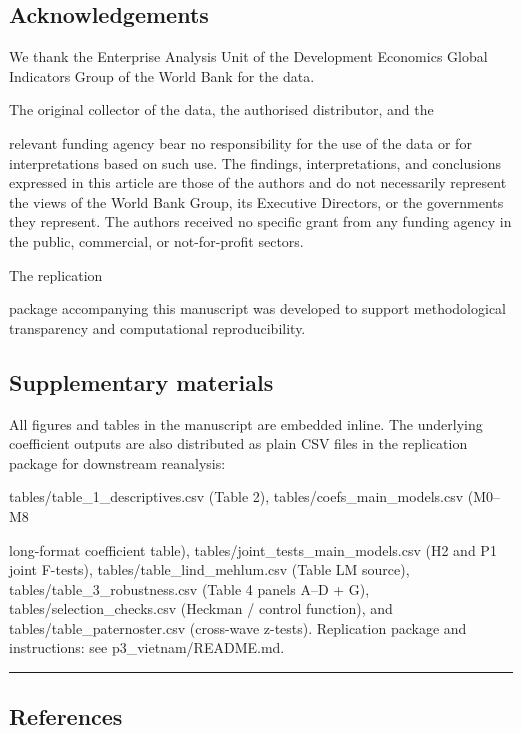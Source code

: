 \documentclass[12pt,a4paper]{article}
\begin{document}
\hypertarget{acknowledgements}{%
\subsection{Acknowledgements}\label{acknowledgements}}

We thank the Enterprise Analysis Unit of the Development Economics
Global Indicators Group of the World Bank for the data.

The original collector of the data, the authorised distributor, and the

relevant funding agency bear no responsibility for the use of the data
or for interpretations based on such use. The findings, interpretations,
and conclusions expressed in this article are those of the authors and
do not necessarily represent the views of the World Bank Group, its
Executive Directors, or the governments they represent. The authors
received no specific grant from any funding agency in the public,
commercial, or not-for-profit sectors.

The replication

package accompanying this manuscript was developed to support
methodological transparency and computational reproducibility.

\hypertarget{supplementary-materials}{%
\subsection{Supplementary materials}\label{supplementary-materials}}

All figures and tables in the manuscript are embedded inline. The
underlying coefficient outputs are also distributed as plain CSV files
in the replication package for downstream reanalysis:

tables/table\_1\_descriptives.csv (Table 2),
tables/coefs\_main\_models.csv (M0--M8

long-format coefficient table), tables/joint\_tests\_main\_models.csv
(H2 and P1 joint F-tests), tables/table\_lind\_mehlum.csv (Table LM
source), tables/table\_3\_robustness.csv (Table 4 panels A--D + G),
tables/selection\_checks.csv (Heckman / control function), and
tables/table\_paternoster.csv (cross-wave z-tests). Replication package
and instructions: see p3\_vietnam/README.md.

\begin{center}\rule{0.5\linewidth}{0.5pt}\end{center}

\hypertarget{references}{%
\subsection{References}\label{references}}
\end{document}
